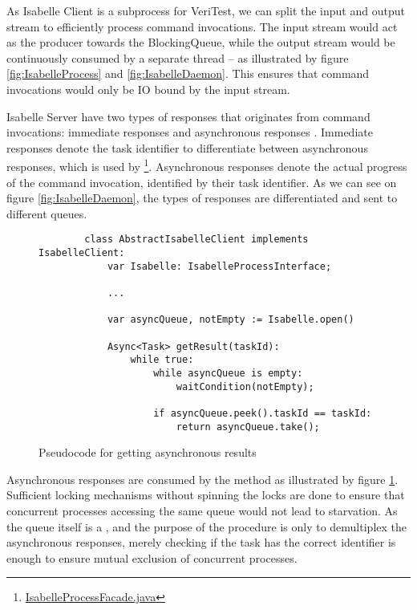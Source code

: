 As Isabelle Client is a subprocess for VeriTest, we can split the input and output stream to efficiently process command invocations. 
The input stream would act as the producer towards the BlockingQueue, while the output stream would be continuously consumed by a separate 
thread -- as illustrated by figure \ref{fig:IsabelleProcess} and \ref{fig:IsabelleDaemon}. This ensures that command invocations would only be 
IO bound by the input stream.

Isabelle Server have two types of responses that originates from command invocations: immediate responses and asynchronous responses 
\cite[Sec 4.2.6]{isabelleSystem}. Immediate responses denote the task identifier to differentiate between asynchronous responses, 
which is used by 
\footnote{\href{https://github.com/achmadafriza/veritest-dev/blob/master/src/main/java/com/veriopt/veritest/isabelle/IsabelleProcessFacade.java}{IsabelleProcessFacade.java}}. 
Asynchronous responses denote the actual progress of the command invocation, 
identified by their task identifier. As we can see on figure \ref{fig:IsabelleDaemon}, the types of responses are differentiated and sent 
to different queues.

\begin{figure}[!htb]
    \begin{lstlisting}
        class AbstractIsabelleClient implements IsabelleClient:
            var Isabelle: IsabelleProcessInterface;
            
            ...

            var asyncQueue, notEmpty := Isabelle.open()

            Async<Task> getResult(taskId):
                while true:
                    while asyncQueue is empty:
                        waitCondition(notEmpty);
                
                    if asyncQueue.peek().taskId == taskId:
                        return asyncQueue.take();
    \end{lstlisting}

    \caption{Pseudocode for getting asynchronous results}
    \label{fig:getResult}
\end{figure}

Asynchronous responses are consumed by the  method as illustrated by figure \ref{fig:getResult}. Sufficient locking 
mechanisms without spinning the locks are done to ensure that concurrent processes accessing the same queue would not lead to starvation.
As the queue itself is a , and the purpose of the procedure is only to demultiplex the asynchronous responses, merely 
checking if the task has the correct identifier is enough to ensure mutual exclusion of concurrent processes.

